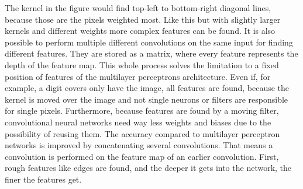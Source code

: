 The kernel in the figure would find top-left to bottom-right diagonal lines, because those are the pixels weighted most.
Like this but with slightly larger kernels and different weights more complex features can be found.
It is also possible to perform multiple different convolutions on the same input for finding different features.
They are stored as a matrix, where every feature represents the depth of the feature map.
This whole process solves the limitation to a fixed position of features of the multilayer perceptrons architecture.
Even if, for example, a digit covers only have the image, all features are found, because the kernel is moved over the image and not single neurons or filters are responsible for single pixels.
Furthermore, because features are found by a moving filter, convolutional neural networks need way less weights and biases due to the possibility of reusing them.
The accuracy compared to multilayer perceptron networks is improved by concatenating several convolutions.
That means a convolution is performed on the feature map of an earlier convolution.
First, rough features like edges are found, and the deeper it gets into the network, the finer the features get.